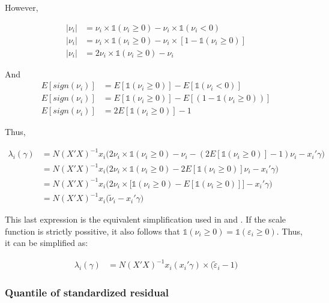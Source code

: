\documentclass[
  authoryear,
  preprint,
  1p]{elsarticle}
\begin{document}
However,

\[\begin{aligned}
|\nu_i| &= \nu_i \times \mathbb{1}(\nu_i \geq 0) - \nu_i \times \mathbb{1}(\nu_i < 0) \\
|\nu_i| &= \nu_i \times \mathbb{1}(\nu_i \geq 0) - \nu_i \times [1-\mathbb{1}(\nu_i \geq 0)] \\
|\nu_i| &= 2 \nu_i \times \mathbb{1}(\nu_i \geq 0) - \nu_i  
\end{aligned}
\]

And \[\begin{aligned}
E[sign(\nu_i)] &= E[\mathbb{1}(\nu_i \geq 0)] - E[\mathbb{1}(\nu_i < 0)] \\
E[sign(\nu_i)] &= E[\mathbb{1}(\nu_i \geq 0)] - E[(1-\mathbb{1}(\nu_i \geq 0))] \\
E[sign(\nu_i)] &= 2 E[\mathbb{1}(\nu_i \geq 0)] - 1
\end{aligned}
\]

Thus,

\[\begin{aligned}
\lambda_i(\gamma) &= N(X'X)^{-1} x_i   \Big( 2 \nu_i \times \mathbb{1}(\nu_i \geq 0) - \nu_i  - ( 2 E[\mathbb{1}(\nu_i \geq 0)] - 1) \nu_i -x_i' \gamma \Big) \\
  &= N(X'X)^{-1} x_i   \Big( 2 \nu_i \times \mathbb{1}(\nu_i \geq 0) -  2 E[\mathbb{1}(\nu_i \geq 0)] \nu_i -x_i' \gamma \Big) \\
  &= N(X'X)^{-1} x_i   \Big( 2 \nu_i \times \big[ \mathbb{1}(\nu_i \geq 0) -  E[\mathbb{1}(\nu_i \geq 0)] \big] -x_i'\gamma \Big) \\
  &= N(X'X)^{-1} x_i   \Big( \tilde \nu_i -x_i' 
  \gamma \Big)
\end{aligned}
\]

This last expression is the equivalent simplification used in
\citet{mss2019} and \citet{im2000}. If the scale function is strictly
possitive, it also follows that
\(\mathbb{1}(\nu_i \geq 0)= \mathbb{1}(\varepsilon_i \geq 0)\). Thus, it
can be simplified as:

\[\begin{aligned}
\lambda_i(\gamma) &= N(X'X)^{-1} x_i ( x_i' \gamma ) \times (\tilde \varepsilon_i -1\big)
\end{aligned}
\]

\hypertarget{quantile-of-standardized-residual}{%
\subsubsection{Quantile of standardized
residual}\label{quantile-of-standardized-residual}}
\end{document}
